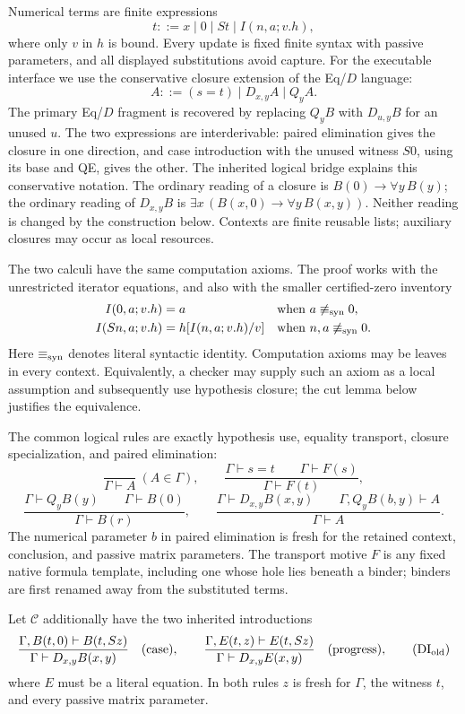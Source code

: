 \documentclass[11pt,letterpaper]{article}
\theoremstyle{definition}\newtheorem{definition}[theorem]{Definition}
\theoremstyle{remark}\newtheorem{remark}[theorem]{Remark}
\begin{document}
Numerical terms are finite expressions
\[
 t::=x\mid0\mid St\mid I(n,a;v.h),
\]
where only $v$ in $h$ is bound.  Every update is fixed finite syntax with
passive parameters, and all displayed substitutions avoid capture.
For the executable interface we use the conservative closure extension of
the Eq/$D$ language:
\[
 A::=(s=t)\mid D_{x,y}A\mid Q_yA.
\]
The primary Eq/$D$ fragment is recovered by replacing $Q_yB$ with
$D_{u,y}B$ for an unused $u$. The two expressions are interderivable:
paired elimination gives the closure in one direction, and case
introduction with the unused witness $S0$, using its base and QE,
gives the other. The inherited
logical bridge explains this conservative notation.
The ordinary reading of a closure is
$B(0)\to\forall y\,B(y)$; the ordinary reading of $D_{x,y}B$ is
$\exists x\,(B(x,0)\to\forall y\,B(x,y))$.  Neither reading is
changed by the construction below.  Contexts are finite reusable lists;
auxiliary closures may occur as local resources.

The two calculi have the same computation axioms.  The proof works with
the unrestricted iterator equations, and also with the smaller
certified-zero inventory
\begin{align*}
 I(0,a;v.h)&=a
 &&\text{when }a\not\equiv_{\rm syn}0,\\
 I(Sn,a;v.h)&=h[I(n,a;v.h)/v]
 &&\text{when }n,a\not\equiv_{\rm syn}0.
\end{align*}
Here $\equiv_{\rm syn}$ denotes literal syntactic identity.  Computation
axioms may be leaves in every context.  Equivalently, a checker may supply
such an axiom as a local assumption and subsequently use hypothesis
closure; the cut lemma below justifies the equivalence.

The common logical rules are exactly hypothesis use, equality transport,
closure specialization, and paired elimination:
\[
 \frac{}{\Gamma\vdash A}\ (A\in\Gamma),
 \qquad
 \frac{\Gamma\vdash s=t\qquad\Gamma\vdash F(s)}
      {\Gamma\vdash F(t)},
\]
\[
 \frac{\Gamma\vdash Q_yB(y)\qquad\Gamma\vdash B(0)}
      {\Gamma\vdash B(r)},
 \qquad
 \frac{\Gamma\vdash D_{x,y}B(x,y)\qquad
       \Gamma,Q_yB(b,y)\vdash A}
      {\Gamma\vdash A}.
\]
The numerical parameter $b$ in paired elimination is fresh for the
retained context, conclusion, and passive matrix parameters.  The
transport motive $F$ is any fixed native formula template, including
one whose hole lies beneath a binder; binders are first renamed away
from the substituted terms.

Let $\mathcal C$ additionally have the two inherited introductions
\[
 \frac{\Gamma,B(t,0)\vdash B(t,Sz)}
      {\Gamma\vdash D_{x,y}B(x,y)}
 \quad\text{(case)},
 \qquad
 \frac{\Gamma,E(t,z)\vdash E(t,Sz)}
      {\Gamma\vdash D_{x,y}E(x,y)}
 \quad\text{(progress)},
 \tag{DI$_{\rm old}$}
\]
where $E$ must be a literal equation.  In both rules $z$ is fresh for
$\Gamma$, the witness $t$, and every passive matrix parameter.
\end{document}

